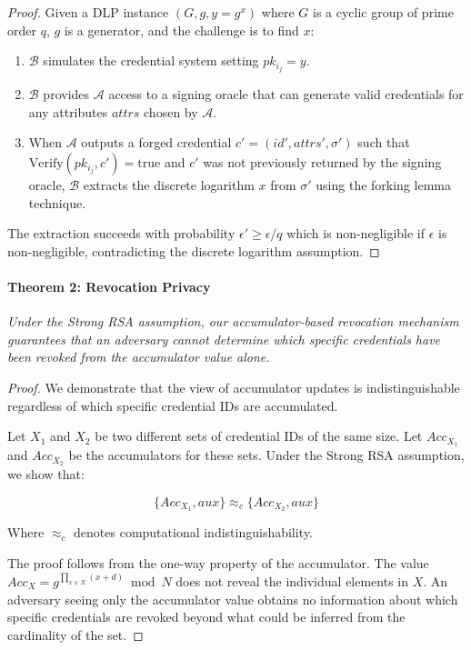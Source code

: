 \documentclass[lettersize,journal]{IEEEtran}
\begin{document}
\begin{itemize}
\begin{proof}
Given a DLP instance $(G, g, y = g^x)$ where $G$ is a cyclic group of prime order $q$, $g$ is a generator, and the challenge is to find $x$:

\begin{enumerate}
    \item $\mathcal{B}$ simulates the credential system setting $pk_{i_j} = y$.
    \item $\mathcal{B}$ provides $\mathcal{A}$ access to a signing oracle that can generate valid credentials for any attributes $attrs$ chosen by $\mathcal{A}$.
    \item When $\mathcal{A}$ outputs a forged credential $c' = (id', attrs', \sigma')$ such that $\text{Verify}(pk_{i_j}, c') = \text{true}$ and $c'$ was not previously returned by the signing oracle, $\mathcal{B}$ extracts the discrete logarithm $x$ from $\sigma'$ using the forking lemma technique.
\end{enumerate}

The extraction succeeds with probability $\epsilon' \geq \epsilon/q$ which is non-negligible if $\epsilon$ is non-negligible, contradicting the discrete logarithm assumption.
\end{proof}

\paragraph{Theorem 2: Revocation Privacy}
\textit{Under the Strong RSA assumption, our accumulator-based revocation mechanism guarantees that an adversary cannot determine which specific credentials have been revoked from the accumulator value alone.}

\begin{proof}
We demonstrate that the view of accumulator updates is indistinguishable regardless of which specific credential IDs are accumulated.

Let $X_1$ and $X_2$ be two different sets of credential IDs of the same size. Let $Acc_{X_1}$ and $Acc_{X_2}$ be the accumulators for these sets. Under the Strong RSA assumption, we show that:

$$\{Acc_{X_1}, aux\} \approx_c \{Acc_{X_2}, aux\}$$

Where $\approx_c$ denotes computational indistinguishability.

The proof follows from the one-way property of the accumulator. The value $Acc_X = g^{\prod_{x \in X}(x+d)} \bmod N$ does not reveal the individual elements in $X$. An adversary seeing only the accumulator value obtains no information about which specific credentials are revoked beyond what could be inferred from the cardinality of the set.


\end{proof}
\end{itemize}
\end{document}
